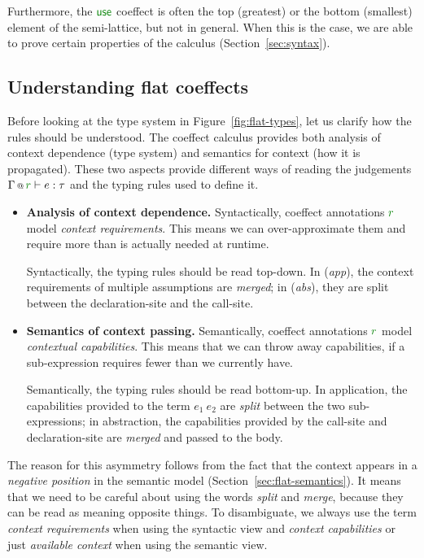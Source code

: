 Furthermore, the $\cunit$ coeffect is often the top (greatest) or the bottom (smallest) 
element of the semi-lattice, but not in general. When this is the case, we are able
to prove certain properties of the calculus (Section~\ref{sec:syntax}).


\subsection{Understanding flat coeffects}

Before looking at the type system in Figure~\ref{fig:flat-types}, let us clarify how the rules
should be understood. The coeffect calculus provides both analysis of context dependence (type 
system) and semantics for context (how it is propagated). These two aspects provide different
ways of reading the judgements $\coctx{\Gamma}{\cclrd{r}} \vdash e : \tau$ and the typing rules
used to define it.

\begin{itemize}
\item \textbf{Analysis of context dependence.}
Syntactically, coeffect annotations $\cclrd{r}$ model \emph{context requirements}. This means
we can over-approximate them and require more than is actually needed at runtime. 

Syntactically, the typing rules should be read top-down. In (\emph{app}), the context requirements 
of multiple assumptions are \emph{merged}; in (\emph{abs}), they are split between the declaration-site
and the call-site.

\item \textbf{Semantics of context passing.}
Semantically, coeffect annotations $\cclrd{r}$ mo\-del \emph{contextual capabilities}. This means
that we can throw away capabilities, if a sub-expression requires fewer than we 
currently have.

Semantically, the typing rules should be read bottom-up. In application, the capabilities 
provided to the term $e_1~e_2$ are \emph{split} between the two sub-expressions; in abstraction,
the capabilities provided by the call-site and declaration-site are \emph{merged} and passed
to the body.
\end{itemize}

The reason for this asymmetry follows from the fact that the context appears in a \emph{negative
position} in the semantic model (Section~\ref{sec:flat-semantics}). It means that we need to be
careful about using the words \emph{split} and \emph{merge}, because they can be read as meaning
opposite things. To disambiguate, we always use the term \emph{context requirements} when using
the syntactic view and \emph{context capabilities} or just \emph{available context} when using 
the semantic view.

